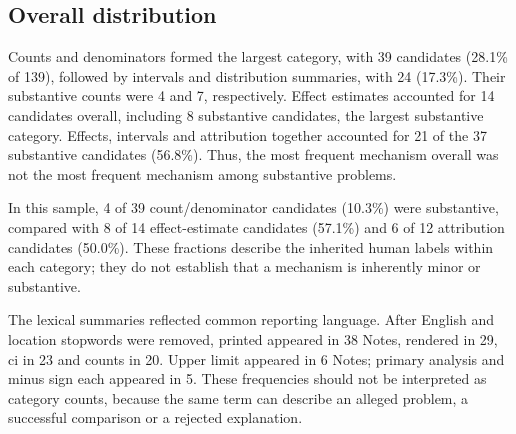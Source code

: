 \documentclass[11pt,a4paper]{article}
\begin{document}
\subsection{Overall distribution}
Counts and denominators formed the largest category, with 39 candidates (28.1\% of 139), followed by intervals and distribution summaries, with 24 (17.3\%). Their substantive counts were 4 and 7, respectively. Effect estimates accounted for 14 candidates overall, including 8 substantive candidates, the largest substantive category. Effects, intervals and attribution together accounted for 21 of the 37 substantive candidates (56.8\%). Thus, the most frequent mechanism overall was not the most frequent mechanism among substantive problems.\par
In this sample, 4 of 39 count/denominator candidates (10.3\%) were substantive, compared with 8 of 14 effect-estimate candidates (57.1\%) and 6 of 12 attribution candidates (50.0\%). These fractions describe the inherited human labels within each category; they do not establish that a mechanism is inherently minor or substantive.\par
The lexical summaries reflected common reporting language. After English and location stopwords were removed, printed appeared in 38 Notes, rendered in 29, ci in 23 and counts in 20. Upper limit appeared in 6 Notes; primary analysis and minus sign each appeared in 5. These frequencies should not be interpreted as category counts, because the same term can describe an alleged problem, a successful comparison or a rejected explanation.\par
\end{document}
